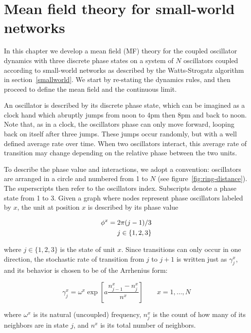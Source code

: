 \chapter{Mean field theory for small-world networks}


In this chapter we develop a mean field (MF) theory for the coupled oscillator dynamics with three discrete phase states on a system of
$N$ oscillators coupled according to small-world networks as described by the Watts-Strogatz algorithm in section~\ref{smallworld}. We
start by re-stating the dynamics rules, and then proceed to define the mean field and the continuous limit.

An oscillator is described by its discrete phase state, which can be imagined as a clock hand which abruptly jumps from noon to 4pm
then 8pm and back to noon. Note that, as in a clock, the oscillators phase can only move forward, looping back on itself after three
jumps. These jumps occur randomly, but with a well defined average rate over time. When two oscillators interact, this average rate of
transition may change depending on the relative phase between the two units.

To describe the phase value and interactions, we adopt a convention: oscillators are arranged in a circle and numbered from 1 to $N$
(see figure~\ref{fig:ring-distance}).  The superscripts then refer to the oscillators index. Subscripts denote a phase state from 1 to
3. Given a graph where nodes represent phase oscillators labeled by $x$, the unit at position $x$ is described by its phase value

\begin{align}
    \phi^x = 2\pi (j-1)/3 \\
    j \in \{1,2,3\} \notag
\end{align}

\noindent where $j\in\{1,2,3\}$ is the state of unit $x$. Since transitions can only occur in one direction, the stochastic rate of
transition from $j$ to $j+1$ is written just as $\gamma^x_j$, and its behavior is chosen to be of the Arrhenius form:

\begin{equation}
    \gamma^x_j = \omega^x\exp\left[ a\frac{n^x_{j-1} - n^x_j}{n^x} \right] \qquad x=1,\dots, N
    \label{rate}
\end{equation}

\noindent where $\omega^x$ is its natural (uncoupled) frequency, $n^x_j$ is the count of how many of its neighbors are in state $j$,
and $n^x$ is its total number of neighbors.

